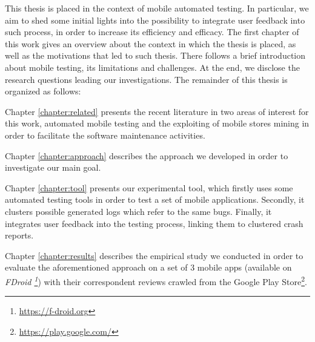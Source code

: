 \label{chapter:intro}
This thesis is placed in the context of mobile automated testing. In particular, we aim to shed some initial lights into the possibility to integrate user feedback into such process, in order to increase its efficiency and efficacy.
The first chapter of this work gives an overview about the context in which the thesis is placed, as well as the motivations that led to such thesis. There follows a brief introduction about mobile testing, its limitations and challenges. At the end, we disclose the research questions leading our investigations. 
The remainder of this thesis is organized as follows: 

Chapter \ref{chapter:related} presents the recent literature in two areas of interest for this work, \ie automated mobile testing and the exploiting of mobile stores mining in order to facilitate the software maintenance activities.

Chapter \ref{chapter:approach} describes the approach we developed in order to investigate our main goal.

Chapter \ref{chapter:tool} presents our experimental tool, which firstly uses some automated testing tools in order to test a set of mobile applications. Secondly, it clusters possible generated logs which refer to the same bugs. Finally, it integrates user feedback into the testing process, linking them to clustered crash reports.  




Chapter \ref{chapter:results} describes the empirical study we conducted in order to evaluate the aforementioned approach on a set of 3 mobile apps (available on \textit{FDroid \footnote{\url{https://f-droid.org}}}) with their correspondent reviews crawled from the Google Play Store\footnote{\url{https://play.google.com/}}. 

